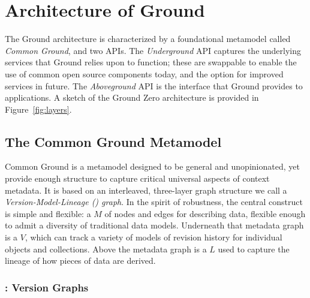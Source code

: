 \documentclass{sig-alternate}
\begin{document}
\vspace{1em}

\section{Architecture of Ground}
\label{sec:arch}
The Ground architecture is characterized by a foundational metamodel called \emph{Common Ground}, and two APIs.  The \emph{Underground} API captures the underlying services that Ground relies upon to function; these are swappable to enable the use of common open source components today, and the option for improved services in future. The \emph{Aboveground} API is the interface that Ground provides to applications.
A sketch of the Ground Zero architecture is provided in Figure~\ref{fig:layers}.


\subsection{The Common Ground Metamodel}
\label{sec:metamodel}
Common Ground is a metamodel designed to be general and unopinionated, yet provide enough structure to capture  critical universal aspects of context metadata.  It is based on an interleaved, three-layer graph structure we call a \emph{Version-Model-Lineage (\vml) graph}.  In the spirit of robustness, the central construct is simple and flexible: a \modelgraph $M$ of nodes and edges for describing data, flexible enough to admit a diversity of traditional data models.
Underneath that metadata graph is a \versiongraph $V$, which can track a variety of models 
of revision history for individual objects and collections. Above the metadata graph is a 
\lineagegraph $L$ used to capture the lineage of how pieces of data are derived.


\subsubsection{\Core: Version Graphs}
\end{document}
